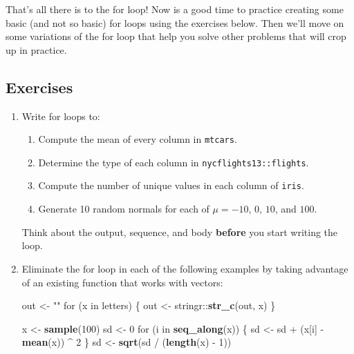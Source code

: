 \documentclass[]{book}
\newenvironment{Shaded}{\begin{snugshade}}{\end{snugshade}}
\newcommand{\KeywordTok}[1]{\textcolor[rgb]{0.13,0.29,0.53}{\textbf{{#1}}}}
\newcommand{\DecValTok}[1]{\textcolor[rgb]{0.00,0.00,0.81}{{#1}}}
\newcommand{\StringTok}[1]{\textcolor[rgb]{0.31,0.60,0.02}{{#1}}}
\newcommand{\NormalTok}[1]{{#1}}
\providecommand{\tightlist}{%
  \setlength{\itemsep}{0pt}\setlength{\parskip}{0pt}}
\begin{document}
That's all there is to the for loop! Now is a good time to practice
creating some basic (and not so basic) for loops using the exercises
below. Then we'll move on some variations of the for loop that help you
solve other problems that will crop up in practice.

\subsection{Exercises}\label{exercises-55}

\begin{enumerate}
\def\labelenumi{\arabic{enumi}.}
\item
  Write for loops to:

  \begin{enumerate}
  \def\labelenumii{\arabic{enumii}.}
  \tightlist
  \item
    Compute the mean of every column in \texttt{mtcars}.
  \item
    Determine the type of each column in \texttt{nycflights13::flights}.
  \item
    Compute the number of unique values in each column of \texttt{iris}.
  \item
    Generate 10 random normals for each of \(\mu = -10\), \(0\), \(10\),
    and \(100\).
  \end{enumerate}

  Think about the output, sequence, and body \textbf{before} you start
  writing the loop.
\item
  Eliminate the for loop in each of the following examples by taking
  advantage of an existing function that works with vectors:

\begin{Shaded}
\begin{Highlighting}[]
\NormalTok{out <-}\StringTok{ ""}
\NormalTok{for (x in letters) \{}
  \NormalTok{out <-}\StringTok{ }\NormalTok{stringr::}\KeywordTok{str_c}\NormalTok{(out, x)}
\NormalTok{\}}

\NormalTok{x <-}\StringTok{ }\KeywordTok{sample}\NormalTok{(}\DecValTok{100}\NormalTok{)}
\NormalTok{sd <-}\StringTok{ }\DecValTok{0}
\NormalTok{for (i in }\KeywordTok{seq_along}\NormalTok{(x)) \{}
  \NormalTok{sd <-}\StringTok{ }\NormalTok{sd +}\StringTok{ }\NormalTok{(x[i] -}\StringTok{ }\KeywordTok{mean}\NormalTok{(x)) ^}\StringTok{ }\DecValTok{2}
\NormalTok{\}}
\NormalTok{sd <-}\StringTok{ }\KeywordTok{sqrt}\NormalTok{(sd /}\StringTok{ }\NormalTok{(}\KeywordTok{length}\NormalTok{(x) -}\StringTok{ }\DecValTok{1}\NormalTok{))}


\end{Highlighting}
\end{Shaded}
\end{enumerate}
\end{document}
